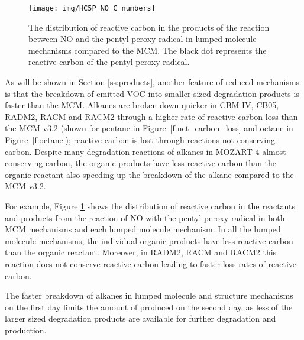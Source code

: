 %
\begin{figure}
    \centering
    \caption{The distribution of reactive carbon in the products of the reaction between NO and the pentyl peroxy radical in lumped molecule mechanisms compared to the MCM. The black dot represents the reactive carbon of the pentyl peroxy radical.}
    \texttt{[image: img/HC5P\_NO\_C\_numbers]}
    \label{f:HC5P_NO}
    \vspace{-2mm}
\end{figure}
%
As will be shown in Section \ref{ss:products}, another feature of reduced mechanisms is that the breakdown of emitted VOC into smaller sized degradation products is faster than the MCM.
Alkanes are broken down quicker in CBM-IV, CB05, RADM2, RACM and RACM2 through a higher rate of reactive carbon loss than the MCM v3.2 (shown for pentane in \mbox{Figure \ref{f:net_carbon_loss}} and octane in \mbox{Figure \ref{f:octane}}); reactive carbon is lost through reactions not conserving carbon.
Despite many degradation reactions of alkanes in MOZART-4 almost conserving carbon, the organic products have less reactive carbon than the organic reactant also speeding up the breakdown of the alkane compared to the MCM v3.2.

For example, Figure \ref{f:HC5P_NO} shows the distribution of reactive carbon in the reactants and products from the reaction of NO with the pentyl peroxy radical in both MCM mechanisms and each lumped molecule mechanism.
In all the lumped molecule mechanisms, the individual organic products have less reactive carbon than the organic reactant. 
Moreover, in RADM2, RACM and RACM2 this reaction does not conserve reactive carbon leading to faster loss rates of reactive carbon. 

The faster breakdown of alkanes in lumped molecule and structure mechanisms on the first day limits the amount of  produced on the second day, as less of the larger sized degradation products are available for further degradation and  production.  
%
